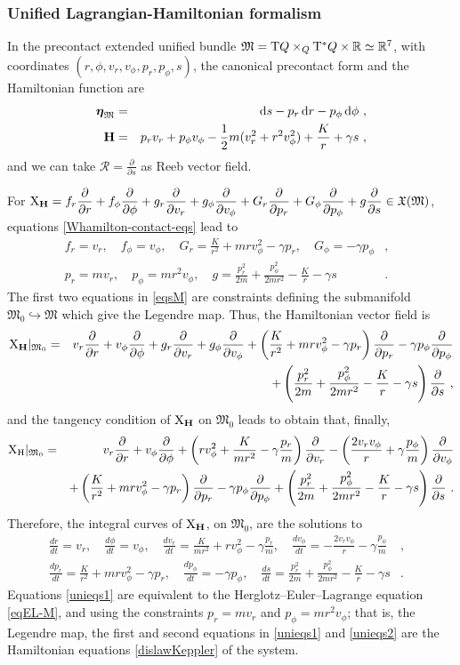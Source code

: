 \documentclass[12pt]{report}
\def\bea{\begin{eqnarray}}
\def\eea{\end{eqnarray}}
\def\beann{\begin{eqnarray*}}
\def\eeann{\end{eqnarray*}}
\def\dst{\displaystyle}
\def\derpar#1#2{\frac{\partial{#1}}{\partial{#2}}}
\def\vf{\mathfrak X}
\def\d{{\rm d}}
\def\Real{\mathbb{R}}
\def\bmeta{\mbox{\boldmath $\eta$}}
\def\X{{\rm X}}
\def\Tan{{\rm T}}
\newcommand{\Reeb}{\mathcal{R}}
\begin{document}
\subsubsection{Unified Lagrangian-Hamiltonian formalism}

In the precontact extended unified bundle
$\mathfrak{M}=\Tan Q\times_Q\Tan^*Q\times\Real\simeq\Real^7$,
with coordinates $(r,\phi,v_r,v_\phi,p_r,p_\phi,s)$, 
the canonical precontact form and the Hamiltonian function are
\beann
\bmeta_{\mathfrak{M}}&=&\d s-p_r\,\d r-p_\phi\,\d\phi \ , \\
{\bf H}&=&p_rv_r+p_\phi v_\phi-\frac{1}{2}m(v_r^2+r^2v_\phi^2)+\frac{K}{r}+\gamma s \ ,
\eeann
and we can take $\dst \Reeb=\derpar{}{s}$ as Reeb vector field.

For $\displaystyle \X_{\bf H}=f_r\derpar{}{r}+
f_\phi\derpar{}{\phi}+g_r\derpar{}{v_r}+g_\phi\derpar{}{v_\phi}+G_r\derpar{}{p_r}+G_\phi\derpar{}{p_\phi}+g\derpar{}{s}\in\vf(\mathfrak{M})$,
equations \eqref{Whamilton-contact-eqs} lead to
\bea
f_r=v_r ,\quad f_\phi=v_\phi ,\quad 
G_r=\frac{K}{r^2}+mrv_\phi^2-\gamma p_r ,\quad G_\phi=-\gamma p_\phi & , & 
\nonumber \\
p_r=mv_r ,\quad p_\phi=mr^2v_\phi ,\quad
g=\frac{p_r^2}{2m}+\frac{p_\phi^2}{2mr^2}-\frac{K}{r}-\gamma s & . & \label{eqsM}
\eea
The first two equations in \eqref{eqsM} are constraints defining the submanifold
$\mathfrak{M}_0\hookrightarrow\mathfrak{M}$ which give the Legendre map.
Thus, the Hamiltonian vector field is
\beann
\X_{\bf H}\vert_{\mathfrak{M}_0}&=&
v_r\derpar{}{r}+v_\phi\derpar{}{\phi}+g_r\derpar{}{v_r}+g_\phi\derpar{}{v_\phi}
+\left(\frac{K}{r^2}+mrv_\phi^2-\gamma p_ r\right)\derpar{}{p_r}-\gamma p_\phi\derpar{}{p_\phi} \\ & &
+\left(\frac{p_r^2}{2m}+\frac{p_\phi^2}{2mr^2}-\frac{K}{r}-\gamma s\right)\derpar{}{s} \ ,
\eeann
and the tangency condition of $\X_{\bf H}$ on $\mathfrak{M}_0$ leads to obtain that, finally,
\beann
\X_{\rm H}\vert_{\mathfrak{M}_0}&=&
v_r\derpar{}{r}+v_\phi\derpar{}{\phi}+
\left(rv_\phi^2+\dst\frac{K}{mr^2}-\gamma\frac{p_r}{m}\right)\derpar{}{v_r}-\left(\frac{2v_rv_\phi}{r}+\gamma\frac{p_\phi}{m}\right)\derpar{}{v_\phi}
\\ & &
+\left(\frac{K}{r^2}+mrv_\phi^2-\gamma p_ r\right)\derpar{}{p_r}-\gamma p_\phi\derpar{}{p_\phi}+\left(\frac{p_r^2}{2m}+\frac{p_\phi^2}{2mr^2}-\frac{K}{r}-\gamma s\right)\derpar{}{s} \ .
\eeann
Therefore, the integral curves of $\X_{\bf H}$,
on $\mathfrak{M}_0$, are the solutions to
\bea
\frac{dr}{dt}=v_r ,\quad
\frac{d\phi}{dt}=v_\phi ,\quad
\frac{dv_r}{dt}=\frac{K}{mr^2}+rv_\phi^2-\gamma\frac{p_r}{m} ,\quad
\frac{dv_\phi}{dt}=-\frac{2v_rv_\phi}{r}-\gamma\frac{p_\phi}{m} & , &
\label{unieqs1}
\\
\frac{dp_r}{dt}=\frac{K}{r^2}+mrv_\phi^2-\gamma p_r ,\quad
\frac{dp_\phi}{dt}=-\gamma p_\phi ,\quad
\frac{ds}{dt}=\frac{p_r^2}{2m}+\frac{p_\phi^2}{2mr^2}-\frac{K}{r}-\gamma s & . &
\label{unieqs2}
\eea
Equations \eqref{unieqs1} are equivalent to the Herglotz--Euler--Lagrange equation \eqref{eqEL-M},
and using the constraints $p_r=mv_r$ 
and $p_\phi=mr^2v_\phi$; that is, the Legendre map,
the first and second equations in \eqref{unieqs1} and \eqref{unieqs2} are
the Hamiltonian equations \eqref{dislawKeppler} of the system.
\end{document}
